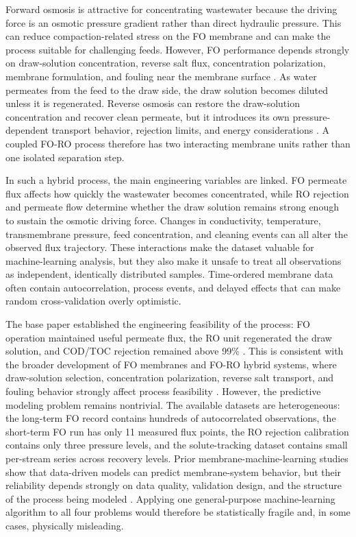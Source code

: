 \documentclass[journal, onecolumn, 12pt]{IEEEtran}
\begin{document}
Forward osmosis is attractive for concentrating wastewater because the driving force is an osmotic pressure gradient rather than direct hydraulic pressure. This can reduce compaction-related stress on the FO membrane and can make the process suitable for challenging feeds. However, FO performance depends strongly on draw-solution concentration, reverse salt flux, concentration polarization, membrane formulation, and fouling near the membrane surface \cite{b7,b10,b11,b12,b13,b14}. As water permeates from the feed to the draw side, the draw solution becomes diluted unless it is regenerated. Reverse osmosis can restore the draw-solution concentration and recover clean permeate, but it introduces its own pressure-dependent transport behavior, rejection limits, and energy considerations \cite{b6,b7}. A coupled FO-RO process therefore has two interacting membrane units rather than one isolated separation step.

In such a hybrid process, the main engineering variables are linked. FO permeate flux affects how quickly the wastewater becomes concentrated, while RO rejection and permeate flow determine whether the draw solution remains strong enough to sustain the osmotic driving force. Changes in conductivity, temperature, transmembrane pressure, feed concentration, and cleaning events can all alter the observed flux trajectory. These interactions make the dataset valuable for machine-learning analysis, but they also make it unsafe to treat all observations as independent, identically distributed samples. Time-ordered membrane data often contain autocorrelation, process events, and delayed effects that can make random cross-validation overly optimistic.

The base paper established the engineering feasibility of the process: FO operation maintained useful permeate flux, the RO unit regenerated the draw solution, and COD/TOC rejection remained above 99\% \cite{b1}. This is consistent with the broader development of FO membranes and FO-RO hybrid systems, where draw-solution selection, concentration polarization, reverse salt transport, and fouling behavior strongly affect process feasibility \cite{b7,b10,b11,b14}. However, the predictive modeling problem remains nontrivial. The available datasets are heterogeneous: the long-term FO record contains hundreds of autocorrelated observations, the short-term FO run has only 11 measured flux points, the RO rejection calibration contains only three pressure levels, and the solute-tracking dataset contains small per-stream series across recovery levels. Prior membrane-machine-learning studies show that data-driven models can predict membrane-system behavior, but their reliability depends strongly on data quality, validation design, and the structure of the process being modeled \cite{b15}. Applying one general-purpose machine-learning algorithm to all four problems would therefore be statistically fragile and, in some cases, physically misleading.
\end{document}
